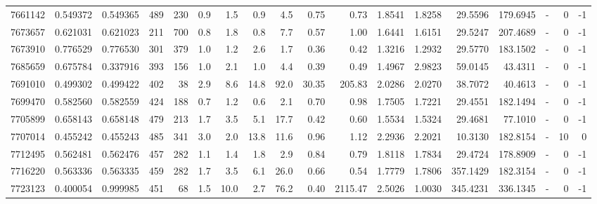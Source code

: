 \begin{tabular}{rrrrrrrrrrrrrrrlrr}
   7661142 & 0.549372 &   0.549365 &  489 &  230 &      0.9 &      1.5 &     0.9 &      4.5 &       0.75 &        0.73 &  1.8541 &  1.8258 &   29.5596 &  179.6945 &             - &        0 &         -1 \\
   7673657 & 0.621031 &   0.621023 &  211 &  700 &      0.8 &      1.8 &     0.8 &      7.7 &       0.57 &        1.00 &  1.6441 &  1.6151 &   29.5247 &  207.4689 &             - &        0 &         -1 \\
   7673910 & 0.776529 &   0.776530 &  301 &  379 &      1.0 &      1.2 &     2.6 &      1.7 &       0.36 &        0.42 &  1.3216 &  1.2932 &   29.5770 &  183.1502 &             - &        0 &         -1 \\
   7685659 & 0.675784 &   0.337916 &  393 &  156 &      1.0 &      2.1 &     1.0 &      4.4 &       0.39 &        0.49 &  1.4967 &  2.9823 &   59.0145 &   43.4311 &             - &        0 &         -1 \\
   7691010 & 0.499302 &   0.499422 &  402 &   38 &      2.9 &      8.6 &    14.8 &     92.0 &      30.35 &      205.83 &  2.0286 &  2.0270 &   38.7072 &   40.4613 &             - &        0 &         -1 \\
   7699470 & 0.582560 &   0.582559 &  424 &  188 &      0.7 &      1.2 &     0.6 &      2.1 &       0.70 &        0.98 &  1.7505 &  1.7221 &   29.4551 &  182.1494 &             - &        0 &         -1 \\
   7705899 & 0.658143 &   0.658148 &  479 &  213 &      1.7 &      3.5 &     5.1 &     17.7 &       0.42 &        0.60 &  1.5534 &  1.5324 &   29.4681 &   77.1010 &             - &        0 &         -1 \\
   7707014 & 0.455242 &   0.455243 &  485 &  341 &      3.0 &      2.0 &    13.8 &     11.6 &       0.96 &        1.12 &  2.2936 &  2.2021 &   10.3130 &  182.8154 &             - &       10 &          0 \\
   7712495 & 0.562481 &   0.562476 &  457 &  282 &      1.1 &      1.4 &     1.8 &      2.9 &       0.84 &        0.79 &  1.8118 &  1.7834 &   29.4724 &  178.8909 &             - &        0 &         -1 \\
   7716220 & 0.563336 &   0.563335 &  459 &  282 &      1.7 &      3.5 &     6.1 &     26.0 &       0.66 &        0.54 &  1.7779 &  1.7806 &  357.1429 &  182.3154 &             - &        0 &         -1 \\
   7723123 & 0.400054 &   0.999985 &  451 &   68 &      1.5 &     10.0 &     2.7 &     76.2 &       0.40 &     2115.47 &  2.5026 &  1.0030 &  345.4231 &  336.1345 &             - &        0 &         -1 \\

\end{tabular}
